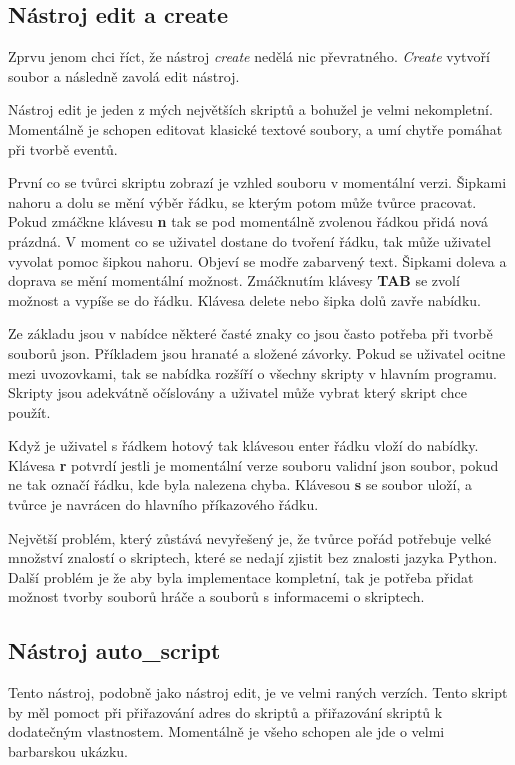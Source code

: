 \documentclass[12pt,a4paper]{article}
\begin{document}
\subsection{Nástroj edit a create}
Zprvu jenom chci říct, že nástroj \textit{create} nedělá nic převratného. \textit{Create} vytvoří soubor a následně zavolá edit nástroj.

Nástroj edit je jeden z mých největších skriptů a bohužel je velmi nekompletní. Momentálně je schopen editovat klasické textové soubory, a umí chytře pomáhat při tvorbě eventů. 

První co se tvůrci skriptu zobrazí je vzhled souboru v momentální verzi. Šipkami nahoru a dolu se mění výběr řádku, se kterým potom může tvůrce pracovat. Pokud zmáčkne klávesu \textbf{n} tak se pod momentálně zvolenou řádkou přidá nová prázdná. V moment co se uživatel dostane do tvoření řádku, tak může uživatel vyvolat pomoc šipkou nahoru. Objeví se modře zabarvený text. Šipkami doleva a doprava se mění momentální možnost. Zmáčknutím klávesy \textbf{TAB} se zvolí možnost a vypíše se do řádku. Klávesa delete nebo šipka dolů zavře nabídku.

Ze základu jsou v nabídce některé časté znaky co jsou často potřeba při tvorbě souborů json. Příkladem jsou hranaté a složené závorky. Pokud se uživatel ocitne mezi uvozovkami, tak se nabídka rozšíří o všechny skripty v hlavním programu. Skripty jsou adekvátně očíslovány a uživatel může vybrat který skript chce použít.

Když je uživatel s řádkem hotový tak klávesou enter řádku vloží do nabídky. Klávesa \textbf{r} potvrdí jestli je momentální verze souboru validní json soubor, pokud ne tak označí řádku, kde byla nalezena chyba. Klávesou \textbf{s} se soubor uloží, a tvůrce je navrácen do hlavního příkazového řádku.

Největší problém, který zůstává nevyřešený je, že tvůrce pořád potřebuje velké množství znalostí o skriptech, které se nedají zjistit bez znalosti jazyka Python. Další problém je že aby byla implementace kompletní, tak je potřeba přidat možnost tvorby souborů hráče a souborů s informacemi o skriptech.
\subsection{Nástroj auto\_script}
Tento nástroj, podobně jako nástroj edit, je ve velmi raných verzích. Tento skript by měl pomoct při přiřazování adres do skriptů  a přiřazování skriptů k dodatečným vlastnostem. Momentálně je všeho schopen ale jde o velmi barbarskou ukázku.
\end{document}
